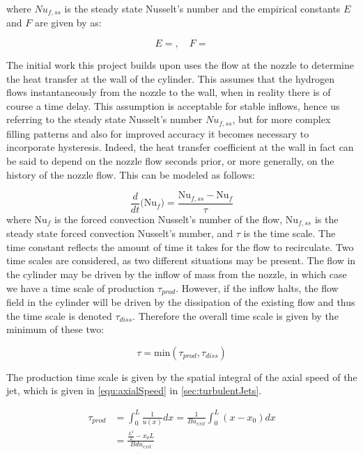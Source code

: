 \noindent where ${Nu}_{f,ss}$ is the steady state Nusselt's number and the empirical constants $E$ and $F$ are given by  as:

\begin{equation}
\label{equ:nusseltReynoldsConsts}
E =   ,  \quad F = 
\end{equation}

The initial work this project builds upon uses the flow at the nozzle to determine the heat transfer at the wall of the cylinder. This assumes that the hydrogen flows instantaneously from the nozzle to the wall, when in reality there is of course a time delay. This assumption is acceptable for stable inflows, hence us referring to the steady state Nusselt's number ${Nu}_{f,ss}$,  but for more complex filling patterns and also for improved accuracy it becomes necessary to incorporate hysteresis. Indeed, the heat transfer coefficient at the wall in fact can be said to depend on the nozzle flow seconds prior, or more generally, on the history of the nozzle flow. This can be modeled as follows: 

\begin{equation}
\frac{d}{dt}\Big(\text{Nu}_f \Big) = \frac{\text{Nu}_{f,ss}-\text{Nu}_f}{\tau}
\end{equation}
where $\text{Nu}_f$ is the forced convection Nusselt's number of the flow, $\text{Nu}_{f,ss}$ is the steady state forced convection Nusselt's number, and $\tau$ is the time scale. The time constant reflects the amount of time it takes for the flow to recirculate. Two time scales are considered, as two different situations may be present. The flow in the cylinder may be driven by the inflow of mass from the nozzle, in which case we have a time scale of production $\tau_{prod}$. However, if the inflow halts, the flow field in the cylinder will be driven by the dissipation of the existing flow and thus the time scale is denoted $\tau_{diss}$. Therefore the overall time scale is given by the minimum of these two: 

\begin{equation}
\tau = \text{min}\left(\tau_{prod},\tau_{diss}\right)
\end{equation}

\noindent The production time scale is given by the spatial integral of the axial speed of the jet, which is given in \cref{equ:axialSpeed} in \cref{sec:turbulentJets}.

\begin{equation}
\begin{aligned}
\tau_{prod} &= \int_{0}^{L} \frac{1}{u(x)} dx = \frac{1}{B u_{exit}} \int_0^L \left( x - x_0 \right) dx \\[2ex]
 &= \frac{\frac{L^2}{2} - x_0L}{Bdu_{exit}}
\end{aligned}
\end{equation}

